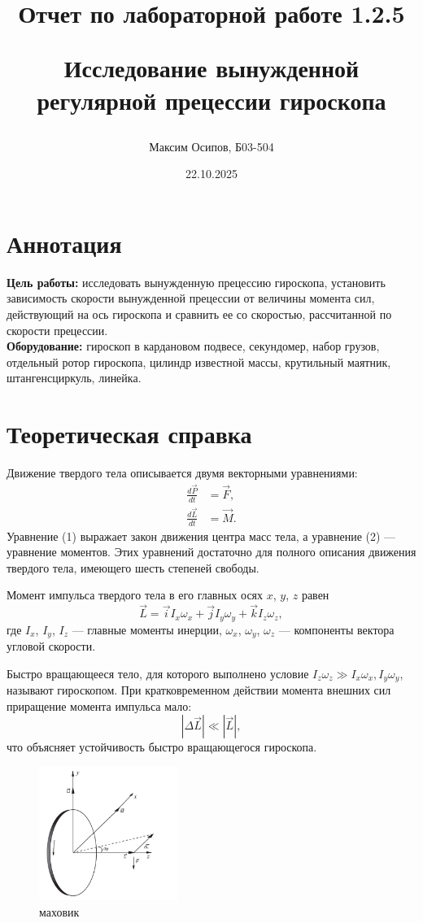 \documentclass[a4paper, 12pt]{article}
\title{Отчет по лабораторной работе 1.2.5

Исследование вынужденной регулярной прецессии гироскопа}
\author{Максим Осипов, Б03-504}
\date{22.10.2025}
\begin{document}
\maketitle

\section{Аннотация}

\textbf{Цель работы:} исследовать вынужденную прецессию гироскопа, установить зависимость скорости вынужденной прецессии от величины момента сил, действующий на ось гироскопа и сравнить ее со скоростью, рассчитанной по скорости прецессии.\\
\textbf{Оборудование:} гироскоп в кардановом подвесе, секундомер, набор грузов, отдельный ротор гироскопа, цилиндр известной массы, крутильный маятник, штангенсциркуль, линейка.

\section{Теоретическая справка}
Движение твердого тела описывается двумя векторными уравнениями:
\begin{align}
\frac{d\vec{P}}{dt} &= \vec{F}, \\
\frac{d\vec{L}}{dt} &= \vec{M}.
\end{align}
Уравнение (1) выражает закон движения центра масс тела, а уравнение (2) — уравнение моментов. Этих уравнений достаточно для полного описания движения твердого тела, имеющего шесть степеней свободы.

Момент импульса твердого тела в его главных осях $x$, $y$, $z$ равен
\begin{equation}
\vec{L} = \vec{i} I_x \omega_x + \vec{j} I_y \omega_y + \vec{k} I_z \omega_z,
\end{equation}
где $I_x$, $I_y$, $I_z$ — главные моменты инерции, $\omega_x$, $\omega_y$, $\omega_z$ — компоненты вектора угловой скорости.

Быстро вращающееся тело, для которого выполнено условие $I_z \omega_z \gg I_x \omega_x, I_y \omega_y$, называют гироскопом. При кратковременном действии момента внешних сил приращение момента импульса мало:
\begin{equation}
|\Delta \vec{L}| \ll |\vec{L}|,
\end{equation}
что объясняет устойчивость быстро вращающегося гироскопа.

\begin{figure}[h]
\centering
\includegraphics[width=0.4\textwidth]{рис1.png}
\caption{маховик}
\label{fig1}
\end{figure}
\end{document}
